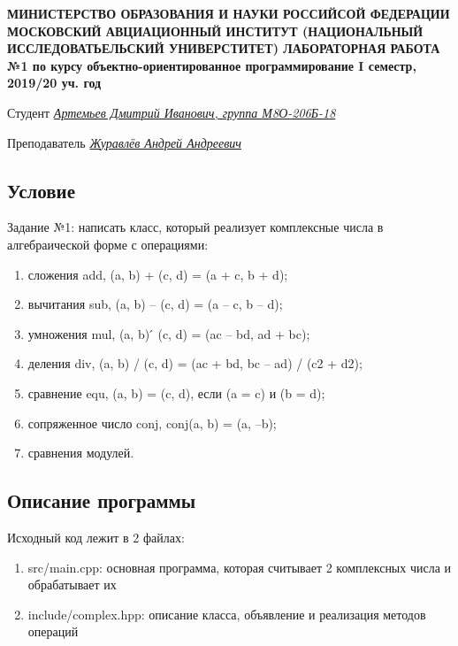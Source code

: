 \documentclass[12pt]{article}
\begin{document}
\begin{titlepage}
\begin{center}
\textbf{МИНИСТЕРСТВО ОБРАЗОВАНИЯ И НАУКИ РОССИЙСОЙ ФЕДЕРАЦИИ
\medskip
МОСКОВСКИЙ АВЦИАЦИОННЫЙ ИНСТИТУТ
(НАЦИОНАЛЬНЫЙ ИССЛЕДОВАТЬЕЛЬСКИЙ УНИВЕРСТИТЕТ)
\vfill\vfill
{\Huge ЛАБОРАТОРНАЯ РАБОТА №1} 
по курсу объектно-ориентированное программирование
I семестр, 2019/20 уч. год}
\end{center}
\vfill

Студент \uline{\it {Артемьев Дмитрий Иванович, группа М8О-206Б-18}\hfill}

Преподаватель \uline{\it {Журавлёв Андрей Андреевич}\hfill}

\vfill
\end{titlepage}

\subsection*{Условие}

Задание №1: написать класс, который реализует комплексные числа в алгебраической форме с операциями: 
\begin{enumerate}
\item сложения add, (a, b) + (c, d) = (a + c, b + d);
\item вычитания sub, (a, b) – (c, d) = (a – c, b – d);
\item умножения mul, (a, b)  ́ (c, d) = (ac – bd, ad + bc);
\item деления div, (a, b) / (c, d) = (ac + bd, bc – ad) / (c2 + d2);
\item сравнение equ, (a, b) = (c, d), если (a = c) и (b = d);
\item сопряженное число conj, conj(a, b) = (a, –b);
\item сравнения модулей.
\end{enumerate}

\subsection*{Описание программы}

Исходный код лежит в 2 файлах:
\begin{enumerate}
\item src/main.cpp: основная программа, которая считывает 2 комплексных числа и обрабатывает их 
\item include/complex.hpp: описание класса, объявление и реализация методов операций
\end{enumerate}
\end{document}
